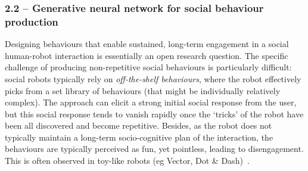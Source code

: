 \subsubsection{2.2 -- Generative neural network for social behaviour production}

%

Designing behaviours that enable sustained, long-term engagement in a social
human-robot interaction is essentially an open research question. The specific
challenge of producing non-repetitive social behaviours is particularly
difficult: social robots typically rely on \emph{off-the-shelf behaviours},
where the robot effectively picks from a set library of behaviours (that might
be individually relatively complex). The approach can elicit a strong initial
social response from the user, but this social response tends to vanish rapidly
once the `tricks' of the robot have been all discovered and become repetitive.
Besides, as the robot does not typically maintain a long-term socio-cognitive
plan of the interaction, the behaviours are typically perceived as fun, yet
pointless, leading to disengagement. This is often observed in toy-like robots
(eg Vector, Dot \& Dash)~\parencite{hoffman2019anki}.

